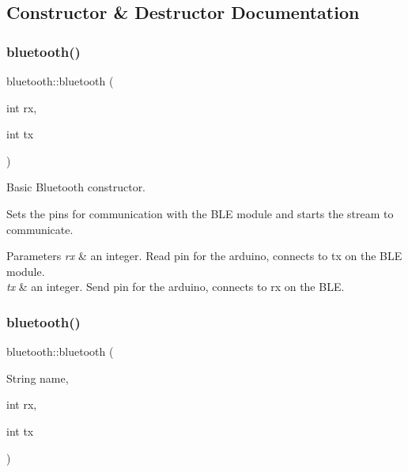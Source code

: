 \subsection{Constructor \& Destructor Documentation}
\mbox{\label{classbluetooth_a1e195afaeb92d85b4145e93fcc3ea376}} 
\subsubsection{\texorpdfstring{bluetooth()}{bluetooth()}\hspace{0.1cm}{\footnotesize\ttfamily [1/2]}}
{\footnotesize\ttfamily bluetooth\+::bluetooth (\begin{DoxyParamCaption}\item[{int}]{rx,  }\item[{int}]{tx }\end{DoxyParamCaption})}



Basic Bluetooth constructor. 

Sets the pins for communication with the B\+LE module and starts the stream to communicate. 
\begin{DoxyParams}{Parameters}
{\em rx} & an integer. Read pin for the arduino, connects to tx on the B\+LE module. \\
\hline
{\em tx} & an integer. Send pin for the arduino, connects to rx on the B\+LE. \\
\hline
\end{DoxyParams}
\mbox{\label{classbluetooth_a552e2e5fe456775e4cbec655a5b26911}} 
\subsubsection{\texorpdfstring{bluetooth()}{bluetooth()}\hspace{0.1cm}{\footnotesize\ttfamily [2/2]}}
{\footnotesize\ttfamily bluetooth\+::bluetooth (\begin{DoxyParamCaption}\item[{String}]{name,  }\item[{int}]{rx,  }\item[{int}]{tx }\end{DoxyParamCaption})}



